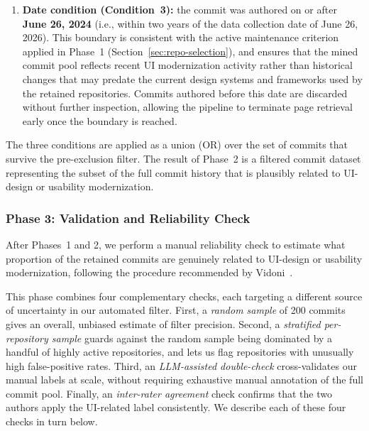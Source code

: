 \documentclass{article}
\begin{document}
\begin{enumerate}
    \item \textbf{Date condition (Condition~3):} the commit was authored
    on or after \textbf{June 26, 2024} (i.e., within two years of the
    data collection date of June 26, 2026). This boundary is consistent
    with the active maintenance criterion applied in Phase~1
    (Section~\ref{sec:repo-selection}), and ensures that the mined
    commit pool reflects recent UI modernization activity rather than
    historical changes that may predate the current design systems and
    frameworks used by the retained repositories. Commits authored before
    this date are discarded without further inspection, allowing the
    pipeline to terminate page retrieval early once the boundary is
    reached.
\end{enumerate}

The three conditions are applied as a union (OR) over the set of
commits that survive the pre-exclusion filter. The result of Phase~2 is
a filtered commit dataset representing the subset of the full commit
history that is plausibly related to UI-design or usability modernization.

\subsubsection{Phase 3: Validation and Reliability Check}
\label{sec:validation}

After Phases~1 and 2, we perform a manual reliability check to estimate
what proportion of the retained commits are genuinely related to UI-design
or usability modernization, following the procedure recommended by
Vidoni~\cite{vidoni2022systematic}.

This phase combines four complementary checks, each targeting a different
source of uncertainty in our automated filter. First, a \emph{random
sample} of 200 commits gives an overall, unbiased estimate of filter
precision. Second, a \emph{stratified per-repository sample} guards
against the random sample being dominated by a handful of highly active
repositories, and lets us flag repositories with unusually high
false-positive rates. Third, an \emph{LLM-assisted double-check}
cross-validates our manual labels at scale, without requiring exhaustive
manual annotation of the full commit pool. Finally, an \emph{inter-rater
agreement} check confirms that the two authors apply the UI-related label
consistently. We describe each of these four checks in turn below.
\end{document}
